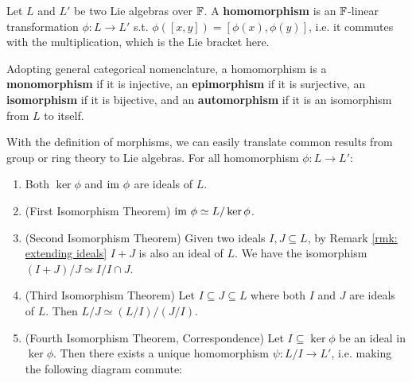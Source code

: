 \documentclass{article}
\begin{document}
\begin{definition}[Morphism]
    Let $L$ and $L'$ be two Lie algebras over $\mathbb{F}$. A \textbf{homomorphism} is an $\mathbb{F}$-linear transformation $\phi: L \to L'$ s.t. $\phi([x, y]) = [\phi(x), \phi(y)]$, i.e. it commutes with the multiplication, which is the Lie bracket here.

    Adopting general categorical nomenclature, a homomorphism is a \textbf{monomorphism} if it is injective, an \textbf{epimorphism} if it is surjective, an \textbf{isomorphism} if it is bijective, and an \textbf{automorphism} if it is an isomorphism from $L$ to itself.
\end{definition}
\nogap
\begin{remark}\label{rmk: extending morphism results}
    With the definition of morphisms, we can easily translate common results from group or ring theory to Lie algebras. For all homomorphism $\phi: L \to L'$:
    \begin{enumerate}
        \item Both $\ker \phi$ and $\mathrm{im}\  \phi$ are ideals of $L$.
        \item (First Isomorphism Theorem) $\mathrm{im}\  \phi \simeq L/\ker \phi$.
        \item (Second Isomorphism Theorem) Given two ideals $I, J \subseteq L$, by Remark \ref{rmk: extending ideals} $I + J$ is also an ideal of $L$. We have the isomorphism $(I + J)/J \simeq I/I \cap J$.
        \item (Third Isomorphism Theorem) Let $I \subseteq J \subseteq L$ where both $I$ and $J$ are ideals of $L$. Then $L/J \simeq (L/I)/(J/I)$.
        \item (Fourth Isomorphism Theorem, Correspondence) Let $I \subseteq \ker \phi$ be an ideal in $\ker \phi$. Then there exists a unique homomorphism $\psi: L/I \to L'$, i.e. making the following diagram commute:
        
        \begin{minipage}{\linewidth}
            \centering
        \end{minipage}
    \end{enumerate}
    \ 
\end{remark}
\end{document}
